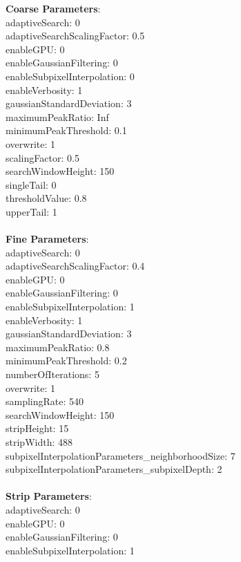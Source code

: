 \documentclass[11pt]{article}
\begin{document}
\textbf{Coarse Parameters}: \\
adaptiveSearch: 0\\
adaptiveSearchScalingFactor: 0.5\\
enableGPU: 0\\
enableGaussianFiltering: 0\\
enableSubpixelInterpolation: 0\\
enableVerbosity: 1\\
gaussianStandardDeviation: 3\\
maximumPeakRatio: Inf\\
minimumPeakThreshold: 0.1\\
overwrite: 1\\
scalingFactor: 0.5\\
searchWindowHeight: 150\\
singleTail: 0\\
thresholdValue: 0.8\\
upperTail: 1\\
\\
\textbf{Fine Parameters}: \\
adaptiveSearch: 0\\
adaptiveSearchScalingFactor: 0.4\\
enableGPU: 0\\
enableGaussianFiltering: 0\\
enableSubpixelInterpolation: 1\\
enableVerbosity: 1\\
gaussianStandardDeviation: 3\\
maximumPeakRatio: 0.8\\
minimumPeakThreshold: 0.2\\
numberOfIterations: 5\\
overwrite: 1\\
samplingRate: 540\\
searchWindowHeight: 150\\
stripHeight: 15\\
stripWidth: 488\\
subpixelInterpolationParameters\_neighborhoodSize: 7\\
subpixelInterpolationParameters\_subpixelDepth: 2\\
\\
\textbf{Strip Parameters}: \\
adaptiveSearch: 0\\
enableGPU: 0\\
enableGaussianFiltering: 0\\
enableSubpixelInterpolation: 1\\
\end{document}
